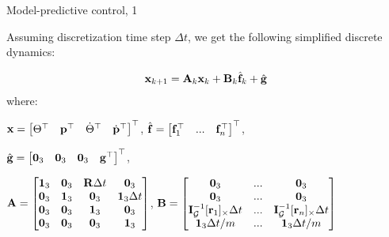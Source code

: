 \documentclass{beamer}
\begin{document}
\begin{frame}{Model-predictive control, 1}
	\begin{flushleft}
		
		Assuming discretization time step $\Delta t$, we get the following simplified discrete dynamics:
		
		\begin{equation}
			\mathbf{x}_{k+1} = \mathbf{A}_k \mathbf{x}_k + \mathbf{B}_k \hat{\mathbf{f}}_k + \hat{\mathbf{g}}
		\end{equation}
		where: 
		
		$\mathbf{x}= \begin{bmatrix}
			\Theta^\top & \mathbf{p}^\top & \dot \Theta^\top & \dot{\mathbf{p}}^\top
		\end{bmatrix}^\top$,
		$ \hat{\mathbf{f}}= \begin{bmatrix}
			\mathbf{f}_1^\top & ... & \mathbf{f}_n^\top
		\end{bmatrix}^\top$,
	
		$ \hat{\bo{g}}= \begin{bmatrix}
		\bo{0}_{3 \time 1}  & \bo{0}_{3 \time 1} & \bo{0}_{3 \time 1}  & \bo{g}\T
		\end{bmatrix}\T$,
	
		$\bo{A}= \begin{bmatrix}
		\bo{1}_{3 \time 3}  & \bo{0}_{3 \time 3} & \bo{R}\Delta t  & \bo{0}_{3 \time 3}
		\\
		\bo{0}_{3 \time 3} & \bo{1}_{3 \time 3}  & \bo{0}_{3 \time 3} & \bo{1}_{3 \time 3} \Delta t 
		\\
		\bo{0}_{3 \time 3} & \bo{0}_{3 \time 3} & \bo{1}_{3 \time 3}  & \bo{0}_{3 \time 3} 
		\\
		\bo{0}_{3 \time 3} & \bo{0}_{3 \time 3} & \bo{0}_{3 \time 3} & \bo{1}_{3 \time 3}
		\end{bmatrix}$, 
		$\bo{B}= \begin{bmatrix}
			\bo{0}_{3 \time 3}  & ...  & \bo{0}_{3 \time 3}
			\\
			\bo{0}_{3 \time 3} & ... & \bo{0}_{3 \time 3}
			\\
			\bo{I}_\mathcal{G}^{-1} [\bo{r}_1]_\times \Delta t  & ...  & \bo{I}_\mathcal{G}^{-1} [\bo{r}_n]_\times \Delta t 
			\\
			\bo{1}_{3 \time 3} \Delta t / m & ... & \bo{1}_{3 \time 3} \Delta t / m
		\end{bmatrix}$
		
	\end{flushleft}
\end{frame}
\end{document}
